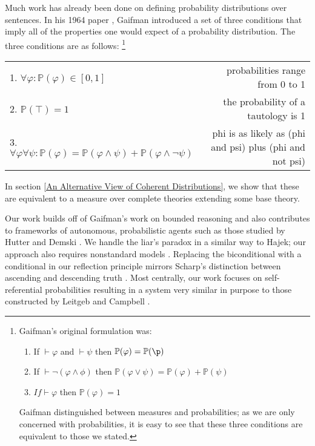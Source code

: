 \documentclass[12pt]{article}
\newcommand{\PP}{\mathbb{P}}
\newcommand{\vp}{\varphi}
\theoremstyle{plain}
\theoremstyle{definition}
\theoremstyle{remark}
\begin{document}
Much work has already been done on defining probability distributions over sentences. In his 1964 paper \cite{gaifman64}, Gaifman introduced a set of three conditions that imply all of the properties one would expect of a probability distribution. The three conditions are as follows:
\footnote{Gaifman's original formulation was:
\begin{enumerate}
\item If $\vdash \vp$ and $\vdash \psi$ then $\PP(\vp)=\PP(\p)$
\item If $\vdash \neg (\vp \wedge \phi)$ then $\PP(\vp \vee \psi) = \PP(\vp) + \PP(\psi)$
\item $If \vdash \vp$ then $\PP(\vp) = 1$
\end{enumerate}
Gaifman distinguished between measures and probabilities; as we are only concerned with probabilities, it is easy to see that these three conditions are equivalent to those we stated.
}
\begin{center}
\begin{tabular}{l r}
1. $\forall \vp: \PP(\vp) \in [0,1]$ & probabilities range from 0 to 1 \\
2. $\PP(\top) = 1$ & the probability of a tautology is 1 \\
3. $\forall \vp \forall \psi: \PP(\vp) = \PP(\vp \wedge \psi) + \PP(\vp \wedge \neg \psi)$ & phi is as likely as (phi and psi) plus (phi and not psi)
\end{tabular}
\end{center}

In section \ref{An Alternative View of Coherent Distributions}, we show that these are equivalent to a measure over complete theories extending some base theory.


% 


Our work builds off of Gaifman's work on bounded reasoning \cite{gaifman04} and also contributes 
to frameworks of autonomous, probabilistic agents such as those studied by Hutter and Demski
\cite{hutter13,demski12}.
We handle the liar's paradox in a similar way to Hajek; our approach also requires nonstandard models \cite{hajek98}.
Replacing the biconditional with a conditional in our reflection principle mirrors Scharp's distinction between ascending and descending truth \cite{scharp13}.
Most centrally, our work focuses on self-referential probabilities resulting in a system very similar in purpose to those constructed by Leitgeb and Campbell \cite{leitgeb08,leitgeb12a,leitgeb12b,campbell14}.
\end{document}
